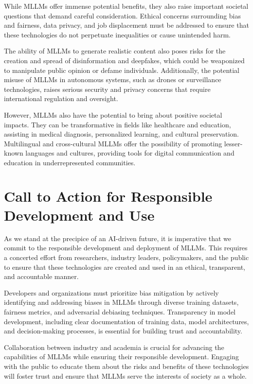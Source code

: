 While MLLMs offer immense potential benefits, they also raise important societal questions that demand careful consideration. Ethical concerns surrounding bias and fairness, data privacy, and job displacement must be addressed to ensure that these technologies do not perpetuate inequalities or cause unintended harm.

The ability of MLLMs to generate realistic content also poses risks for the creation and spread of disinformation and deepfakes, which could be weaponized to manipulate public opinion or defame individuals. Additionally, the potential misuse of MLLMs in autonomous systems, such as drones or surveillance technologies, raises serious security and privacy concerns that require international regulation and oversight.

However, MLLMs also have the potential to bring about positive societal impacts. They can be transformative in fields like healthcare and education, assisting in medical diagnosis, personalized learning, and cultural preservation. Multilingual and cross-cultural MLLMs offer the possibility of promoting lesser-known languages and cultures, providing tools for digital communication and education in underrepresented communities.

\section{Call to Action for Responsible Development and Use}

As we stand at the precipice of an AI-driven future, it is imperative that we commit to the responsible development and deployment of MLLMs. This requires a concerted effort from researchers, industry leaders, policymakers, and the public to ensure that these technologies are created and used in an ethical, transparent, and accountable manner.

Developers and organizations must prioritize bias mitigation by actively identifying and addressing biases in MLLMs through diverse training datasets, fairness metrics, and adversarial debiasing techniques. Transparency in model development, including clear documentation of training data, model architectures, and decision-making processes, is essential for building trust and accountability.

Collaboration between industry and academia is crucial for advancing the capabilities of MLLMs while ensuring their responsible development. Engaging with the public to educate them about the risks and benefits of these technologies will foster trust and ensure that MLLMs serve the interests of society as a whole.

